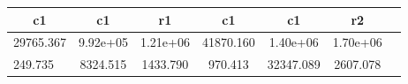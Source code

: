 \begin{table}[htbp]
\begin{tabular}{lcccccc} \hline \hline
 \multicolumn{1}{c}{ c1 }  & c1  & r1  & c1  & c1  & r2  \\  \hline 
29765.367 &  9.92e+05 &  1.21e+06 & 41870.160 &  1.40e+06 &  1.70e+06 \\  
  249.735 &  8324.515 &  1433.790 &   970.413 & 32347.089 &  2607.078 \\  
\hline \hline \end{tabular}
\end{table}
